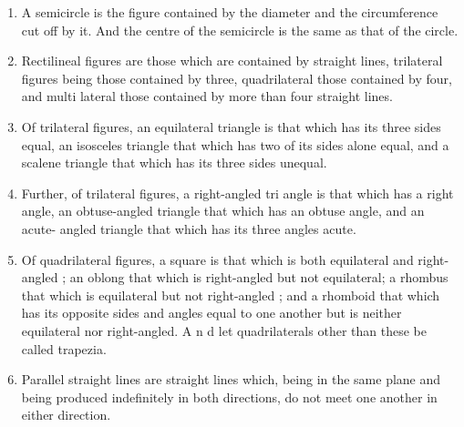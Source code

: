 \begin{enumerate}
\item A semicircle is the figure contained by the diameter and the circumference cut off by it. And the centre of the semicircle is the same as that of the circle.
\item Rectilineal figures are those which are contained by straight lines, trilateral figures being those contained by three, quadrilateral those contained by four, and multi­ lateral those contained by more than four straight lines.
\item Of trilateral figures, an equilateral triangle is that which has its three sides equal, an isosceles triangle that which has two of its sides alone equal, and a scalene triangle that which has its three sides unequal.
\item Further, of trilateral figures, a right-angled tri­ angle is that which has a right angle, an obtuse-angled triangle that which has an obtuse angle, and an acute- angled triangle that which has its three angles acute.
\item Of quadrilateral figures, a square is that which is both equilateral and right-angled ; an oblong that which is right-angled but not equilateral; a rhombus that which is equilateral but not right-angled ; and a rhomboid that which has its opposite sides and angles equal to one another but is neither equilateral nor right-angled. A n d let quadrilaterals other than these be called trapezia.
\item Parallel straight lines are straight lines which, being in the same plane and being produced indefinitely in both directions, do not meet one another in either direction.

\end{enumerate}

\clearpage